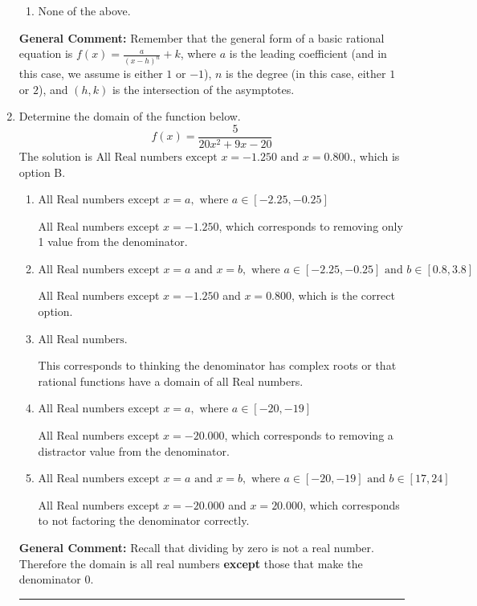 \documentclass{extbook}[14pt]
\newcommand{\litem}[1]{\item #1

\rule{\textwidth}{0.4pt}}
\begin{document}
\begin{enumerate}
{\begin{enumerate}[label=\Alph*.]
\item None of the above.\end{enumerate}
\textbf{General Comment:} Remember that the general form of a basic rational equation is $ f(x) = \frac{a}{(x-h)^n} + k$, where $a$ is the leading coefficient (and in this case, we assume is either $1$ or $-1$), $n$ is the degree (in this case, either $1$ or $2$), and $(h, k)$ is the intersection of the asymptotes.
}
\litem{
Determine the domain of the function below.
\[ f(x) = \frac{5}{20x^{2} +9 x -20} \]The solution is \( \text{All Real numbers except } x = -1.250 \text{ and } x = 0.800. \), which is option B.\begin{enumerate}[label=\Alph*.]
\item \( \text{All Real numbers except } x = a, \text{ where } a \in [-2.25, -0.25] \)

All Real numbers except $x = -1.250$, which corresponds to removing only 1 value from the denominator.
\item \( \text{All Real numbers except } x = a \text{ and } x = b, \text{ where } a \in [-2.25, -0.25] \text{ and } b \in [0.8, 3.8] \)

All Real numbers except $x = -1.250$ and $x = 0.800$, which is the correct option.
\item \( \text{All Real numbers.} \)

This corresponds to thinking the denominator has complex roots or that rational functions have a domain of all Real numbers.
\item \( \text{All Real numbers except } x = a, \text{ where } a \in [-20, -19] \)

All Real numbers except $x = -20.000$, which corresponds to removing a distractor value from the denominator.
\item \( \text{All Real numbers except } x = a \text{ and } x = b, \text{ where } a \in [-20, -19] \text{ and } b \in [17, 24] \)

All Real numbers except $x = -20.000$ and $x = 20.000$, which corresponds to not factoring the denominator correctly.
\end{enumerate}

\textbf{General Comment:} Recall that dividing by zero is not a real number. Therefore the domain is all real numbers \textbf{except} those that make the denominator 0.
}
\end{enumerate}
\end{document}
